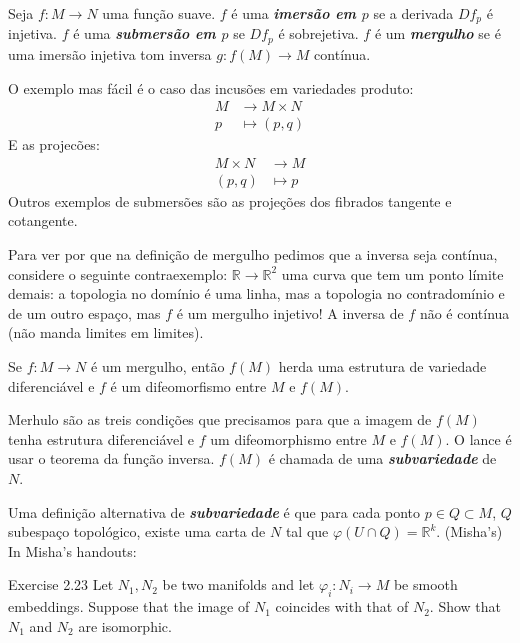 \begin{defn}\leavevmode
Seja \(f:M \to N\) uma função suave. \(f\) é uma \textit{\textbf{imersão em $p$}} se a derivada \(Df_p\) é injetiva. \(f\) é uma \textit{\textbf{submersão em $p$}} se \(Df_p\) é sobrejetiva. \(f\) é um \textit{\textbf{mergulho}} se é uma imersão injetiva tom inversa \(g:f(M) \to M\) contínua.
\end{defn}

\begin{example}\leavevmode
	O exemplo mas fácil é o caso das incusões em variedades produto:
	\begin{align*}
		M &\longrightarrow M \times N \\
		p &\longmapsto (p,q)
	\end{align*}
	E as projecões:
	\begin{align*}
		M \times N &\longrightarrow M \\
		(p,q) &\longmapsto p
	\end{align*}
	Outros exemplos de submersões são as projeções dos fibrados tangente e cotangente.
\end{example}

Para ver por que na definição de mergulho pedimos que a inversa seja contínua, considere o seguinte contraexemplo: \(\mathbb{R} \to \mathbb{R}^2\) uma curva que tem um ponto límite demais: a topologia no domínio é uma linha, mas a topologia no contradomínio e de um outro espaço, mas $f$ é um mergulho injetivo! A inversa de $f$ não é contínua (não manda limites em limites).

\begin{remark}\leavevmode
	Se \(f:M \to N\) é um mergulho, então \(f(M)\) herda uma estrutura de variedade diferenciável e $f$ é um difeomorfismo entre \(M\) e \(f(M)\).
\end{remark}

\begin{upshot}\leavevmode
	Merhulo são as treis condições que precisamos para que a imagem de $f(M)$ tenha estrutura diferenciável e \(f\) um difeomorphismo entre \(M\) e \(f(M)\). O lance é usar o teorema da função inversa. \(f(M)\) é chamada de uma \textit{\textbf{subvariedade}} de $N$.
\end{upshot}
Uma definição alternativa de \textit{\textbf{subvariedade}} é que para cada ponto \(p \in  Q \subset M\), \(Q\) subespaço topológico, existe uma carta de $N$ tal que \(\varphi(U \cap Q)=\mathbb{R}^k\). (Misha's) In Misha's handouts:
\begin{thing4}{Exercise 2.23}\label{exer:2.23}\leavevmode
Let \(N_1,N_2\) be two manifolds and let \(\varphi_i:N_i\to M\) be smooth embeddings. Suppose that the image of \(N_1\) coincides with that of \(N_2\). Show that \(N_1\) and \(N_2\) are isomorphic.
\end{thing4}

